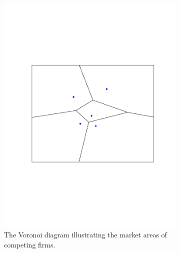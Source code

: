 \documentclass[preprint, 12pt]{elsarticle}
\begin{document}
\begin{figure}
	\caption{Example with five competing firms (blue markers) in a market where $\mu=0$ and $n_l/n_r = 1$.}
	\centering
	\begin{subfigure}[t]{0.31\textwidth}
		\includegraphics[width=\textwidth, trim={34mm 76mm 28mm 76mm}]{Graphics/maxcov_a_voronoi.pdf}
		\caption{The Voronoi diagram illustrating the market areas of competing firms.}
		\label{fig:maxcov_voronoi}
	\end{subfigure}
	~
	\begin{subfigure}[t]{0.31\textwidth}

\end{subfigure}
\end{figure}
\end{document}
